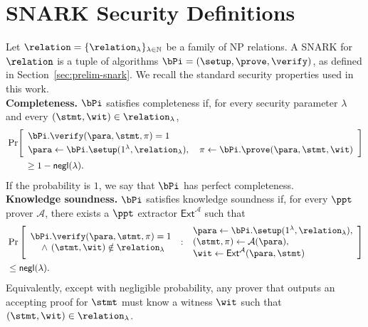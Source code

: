 \iffalse
\section{SNARK Security Definitions}
\label{app:snark-security}

Let \(\relation=\{\relation_\lambda\}_{\lambda\in\mathbb{N}}\) be a family of
NP relations.  A SNARK for \(\relation\) is a tuple of algorithms
\(\bPi=(\setup,\prove,\verify)\), as defined in
Section~\ref{sec:prelim-snark}.  We recall the standard security properties
used in this work. \\

\noindent\textbf{Completeness.}
\(\bPi\) satisfies completeness if, for every security parameter \(\lambda\)
and every \((\stmt,\wit)\in\relation_\lambda\),
\[
\begin{aligned}
&\Pr\!\left[
\begin{array}{l}
  \bPi.\verify(\para,\stmt,\pi)=1
  \\[1mm]
  \para\gets\bPi.\setup(1^\lambda,\relation_\lambda),
  \quad
  \pi\gets\bPi.\prove(\para,\stmt,\wit)
\end{array}
\right]
\\
&\hspace{2em}\ge 1-\textsf{negl}(\lambda).
\end{aligned}
\]
If the probability is \(1\), we say that \(\bPi\) has perfect completeness. \\

\noindent\textbf{Knowledge soundness.}
\(\bPi\) satisfies knowledge soundness if, for every \(\ppt\) prover
\(\mathcal{A}\), there exists a \(\ppt\) extractor
\(\mathsf{Ext}^{\mathcal{A}}\) such that
\[
\begin{aligned}
&\Pr\left[
\begin{array}{l}
  \bPi.\verify(\para,\stmt,\pi)=1 \\
  \quad {}\wedge{}\,(\stmt,\wit)\notin\relation_\lambda
\end{array}
\;:\;
\begin{array}{l}
  \para\gets\bPi.\setup(1^\lambda,\relation_\lambda),\\
  (\stmt,\pi)\gets\mathcal{A}(\para),\\
  \wit\gets\mathsf{Ext}^{\mathcal{A}}(\para,\stmt)
\end{array}
\right] \\
&\le \textsf{negl}(\lambda).
\end{aligned}
\]
Equivalently, except with negligible probability, any prover that outputs an
accepting proof for \(\stmt\) must know a witness \(\wit\) such that
\((\stmt,\wit)\in\relation_\lambda\). \\


